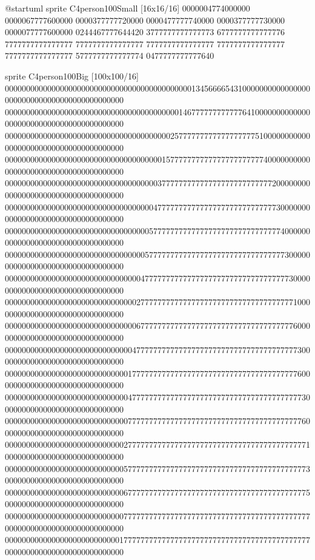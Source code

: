 \documentclass[letterpaper,10pt,english]{sphinxmanual}
\begin{document}
\begin{sphinxVerbatim}[commandchars=\\\{\},numbers=left,firstnumber=1,stepnumber=1]
@startuml
sprite \PYGZdl{}C4person100Small [16x16/16] \PYGZob{}
0000004774000000
0000067777600000
0000377777720000
0000477777740000
0000377777730000
0000077777600000
0244467777644420
3777777777777773
6777777777777776
7777777777777777
7777777777777777
7777777777777777
7777777777777777
7777777777777777
5777777777777774
0477777777777640
\PYGZcb{}

sprite \PYGZdl{}C4person100Big [100x100/16] \PYGZob{}
0000000000000000000000000000000000000000000013456666543100000000000000000000000000000000000000000000
0000000000000000000000000000000000000000014677777777777764100000000000000000000000000000000000000000
0000000000000000000000000000000000000002577777777777777777751000000000000000000000000000000000000000
0000000000000000000000000000000000000157777777777777777777777400000000000000000000000000000000000000
0000000000000000000000000000000000003777777777777777777777777772000000000000000000000000000000000000
0000000000000000000000000000000000047777777777777777777777777777300000000000000000000000000000000000
0000000000000000000000000000000000577777777777777777777777777777740000000000000000000000000000000000
0000000000000000000000000000000005777777777777777777777777777777773000000000000000000000000000000000
0000000000000000000000000000000047777777777777777777777777777777777300000000000000000000000000000000
0000000000000000000000000000000277777777777777777777777777777777777710000000000000000000000000000000
0000000000000000000000000000000677777777777777777777777777777777777760000000000000000000000000000000
0000000000000000000000000000004777777777777777777777777777777777777773000000000000000000000000000000
0000000000000000000000000000017777777777777777777777777777777777777776000000000000000000000000000000
0000000000000000000000000000047777777777777777777777777777777777777777300000000000000000000000000000
0000000000000000000000000000077777777777777777777777777777777777777777600000000000000000000000000000
0000000000000000000000000000277777777777777777777777777777777777777777710000000000000000000000000000
0000000000000000000000000000577777777777777777777777777777777777777777730000000000000000000000000000
0000000000000000000000000000677777777777777777777777777777777777777777750000000000000000000000000000
0000000000000000000000000000777777777777777777777777777777777777777777770000000000000000000000000000
0000000000000000000000000001777777777777777777777777777777777777777777770000000000000000000000000000

\end{sphinxVerbatim}
\end{document}
